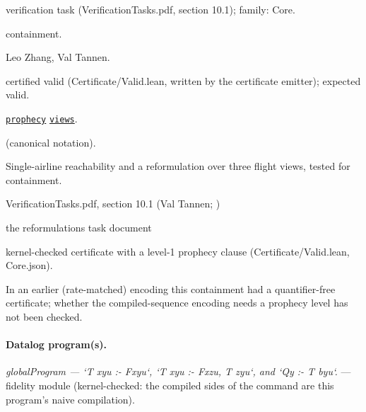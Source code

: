 \documentclass[10pt]{article}
\begin{document}
\begin{description}[leftmargin=2.6cm,style=nextline,itemsep=1pt]

\item[Category] verification task (VerificationTasks.pdf, section 10.1); family: Core.

\item[Kind] containment.

\item[Contributors] Leo Zhang, Val Tannen.

\item[Status] certified valid (Certificate/Valid.lean, written by the certificate emitter); expected valid.

\item[Tags] \hyperref[tag:prophecy]{\texttt{prophecy}} \hyperref[tag:views]{\texttt{views}}.

\item[Input]  (canonical notation).

\item[Summary] Single-airline reachability and a reformulation over three flight views, tested for containment.

\item[Sources] {\raggedright VerificationTasks.pdf, section 10.1 (Val Tannen; ) \par the reformulations task document\par}

\item[Prophecy] kernel-checked certificate with a level-1 prophecy clause (Certificate/Valid.lean, Core.json).

\item[Note] In an earlier (rate-matched) encoding this containment had a quantifier-free certificate; whether the compiled-sequence encoding needs a prophecy level has not been checked.

\end{description}

\paragraph{Datalog program(s).}

{\raggedright\textit{globalProgram --- `T xyu :- Fxyu`, `T xyu :- Fxzu, T zyu`, and `Qy :- T byu`.} --- fidelity module (kernel-checked: the compiled sides of the command are this program's naive compilation).\par}
\end{document}
